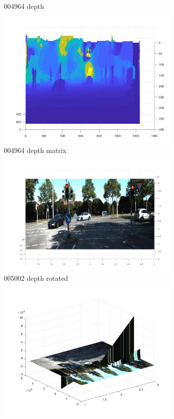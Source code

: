 \documentclass{csc_assignment4}
\begin{document}
\begin{description}
\begin{enumerate}[label=(\alph*)]
\begin{figure}
\vspace*{-5mm}
\caption{004964 depth}
\end{figure}
\begin{figure}
\includegraphics[width=0.8\textwidth, center]{data/a4q1c/004964.jpg}
\vspace*{-5mm}
\caption{004964 depth matrix}
\end{figure}
\begin{figure}
\includegraphics[width=0.8\textwidth, center]{data/a4q1c/005002_depth.jpg}
\vspace*{-5mm}
\caption{005002 depth rotated}
\end{figure}
\begin{figure}[t!]
\includegraphics[width=0.8\textwidth, center]{data/a4q1c/005002_depth_rotated.jpg}

\end{figure}
\end{enumerate}
\end{description}
\end{document}
